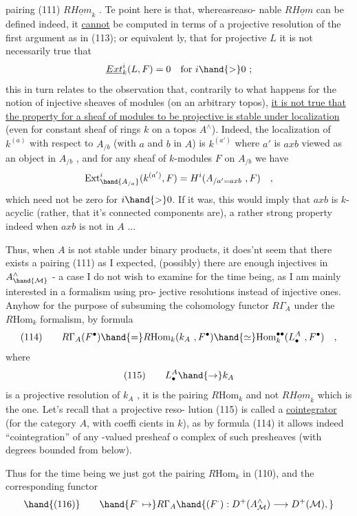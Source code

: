
pairing (111) $R\underline{Hom}_k$ . Te point  here is that, whereasreaso-%
nable $R\underline{Hom}$ can be defined indeed, it \uline{cannot} be computed in terms of
a projective resolution of the first argument as in (113); or equivalent%
ly, that for projective $L$ it is not necessarily true that
\[ \underline{Ext}^i_k(L,F) = 0 \quad \text{for } i \hand{>} 0 \ ; \]
this in turn relates to the observation that, contrarily to what
happens for the notion of injective sheaves of modules (on an arbitrary
topos), \uline{it is not true that the property for a sheaf of modules to be
projective is stable under localization}\xout{\unsure{,}} (even for constant sheaf of
rings $k$ on a topos $A^{\wedge}$). Indeed, the localization of $k^{(a)}$ with respect
to $A_{/b}$ (with $a$ and $b$ in $A$) is  $k^{(a')}$ where $a'$ is $axb$ viewed
as an object in $A_{/b}$ , and  for any sheaf of $k$-modules $F$ on $A_{/b}$
we have
\[ \mathrm{Ext}^i_{\hand{A_{/a}}}(k^{(a')},F) = H^i(A_{/a'=axb} \ , F) \quad , \]
which need not be zero  for $i \hand{>} 0$. If it was, this would  imply
that $axb$ is $k$-acyclic (rather, that it's connected components are),
a rather strong property indeed when $axb$ is not in $A$ ...

Thus, when $A$ is not stable under binary products, it does'nt
seem that there exists a pairing (111) as I expected,  (possibly)
 there are enough injectives in $A^{\wedge}_{\hand{\mathcal{M}}}$ - a case I do not wish to examine
for the time being, as I am mainly interested in a formalism using pro-%
jective resolutions instead of injective ones. Anyhow for the purpose
of subsuming the cohomology functor $R\Gamma_A$ under the $R\mathrm{Hom}_k$ formalism,
by formula
\[ (114) \qquad R\Gamma_A(F^{\bullet}) \hand{=} R\mathrm{Hom}_k(k_A \ , F^{\bullet}) \hand{\simeq} \mathrm{Hom}_k^{\bullet\bullet}(L^A_{\bullet} \ , F^{\bullet}) \quad , \]
where
\[ (115) \qquad L^A_{\bullet} \hand{\to} k_A \]
is a projective resolution of $k_A$ , it is the pairing $R\mathrm{Hom}_k$ and not
$R\underline{Hom}_k$ which is the  one. Let's recall that a projective reso-%
lution (115) is called a \uline{cointegrator} (for the category $A$, with coeffi%
cients in $k$), as by formula (114) it allows indeed ``cointegration''
of any -valued presheaf o complex of such presheaves (with degrees
bounded from below).

Thus for the time being we just got the pairing $R\mathrm{Hom}_k$ in (110),
and the corresponding functor
\[ \hand{(116)} \qquad \hand{F^{\cdot} \mapsto} R\Gamma_A\hand{(F^{\cdot}) : D^+(A^{\wedge}_{\mathcal{M}}) \longrightarrow D^+(\mathcal{M}) ,} \]

